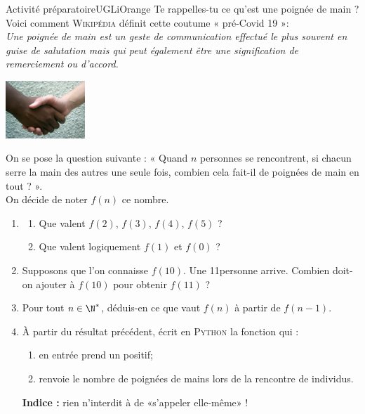 \documentclass[a4paper,12pt,french]{article}
\begin{document}

\begin{encadrecolore}{Activité préparatoire}{UGLiOrange}
Te rappelles-tu ce qu'est une poignée de main ? Voici comment \textsc{Wikipédia} définit cette coutume « pré-Covid 19 »:\\
\textit{Une poignée de main est un geste de communication effectué le plus souvent en guise de salutation mais qui peut également être une signification de remerciement ou d'accord.}
\begin{center}
\includegraphics[width=3cm]{img/poignee.jpg}
\end{center}
On se pose la question suivante : « Quand $n$ personnes se rencontrent, si chacun serre la main des autres une seule fois, combien cela fait-il de poignées de main en tout ? ».\\
On décide de noter $f(n)$ ce nombre.
\begin{enumerate}[\bfseries 1.]
	\item 	\begin{enumerate}[\bfseries a.]
    	\item 	Que valent $f(2)$, $f(3)$, $f(4)$, $f(5)$ ?
    	\item 	Que valent logiquement $f(1)$ et $f(0)$ ?
    \end{enumerate}
	\item 	Supposons que l'on connaisse $f(10)$. Une 11\eme personne arrive. Combien doit-on ajouter à $f(10)$ pour obtenir $f(11)$ ?
    \item   Pour tout $n\in\N^*$, déduis-en ce que vaut $f(n)$ à partir de $f(n-1)$.
    \item   À partir du résultat précédent, écrit en \textsc{Python} la fonction  qui :
    \begin{enumerate}[--]
    	\item 	en entrée prend un  positif;
    	\item 	renvoie le nombre de poignées de mains lors de la rencontre de  individus.
    \end{enumerate}
    \textbf{Indice :} rien n'interdit à  de «s'appeler elle-même» !
\end{enumerate}
\end{encadrecolore}
\end{document}
